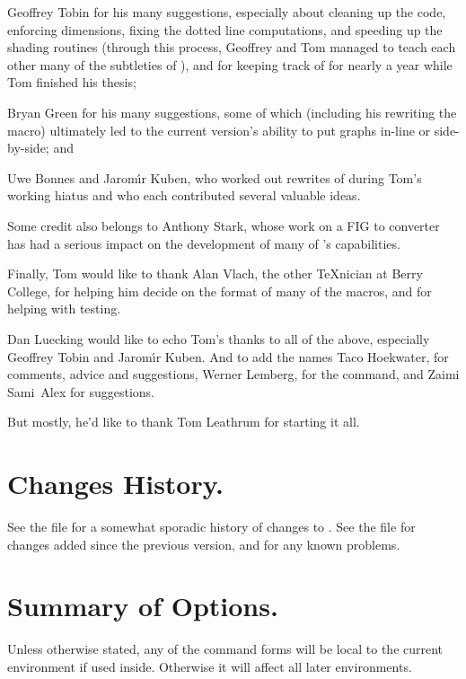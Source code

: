 \documentclass[letterpaper]{article}
\begin{document}
Geoffrey Tobin
for his many suggestions, especially about cleaning up the \MF{} code,
enforcing dimensions, fixing the dotted line computations, and speeding
up the shading routines (through this process, Geoffrey and Tom managed
to teach each other many of the subtleties of \MF{}), and for keeping
track of \mfp{} for nearly a year while Tom finished his thesis;

Bryan Green
for his many suggestions, some of which (including his rewriting the
 macro) ultimately led to the current version's ability to
put graphs in-line or side-by-side; and

Uwe Bonnes and
Jarom\'\i r Kuben,
who worked out rewrites of \mfp{} during Tom's working hiatus and who
each contributed several valuable ideas.

Some credit also belongs to
Anthony Stark,
whose work on a FIG to \MF{} converter has had a serious impact on the
development of many of \mfp{}'s capabilities.

Finally, Tom would like to thank
Alan Vlach,
the other \TeX{}nician at Berry College, for helping him decide on the
format of many of the macros, and for helping with testing.

\medskip
Dan Luecking would like to echo Tom's thanks to all of the above,
especially Geoffrey Tobin and Jarom\'\i r Kuben. And to add the names
Taco Hoekwater, for comments, advice and suggestions, Werner Lemberg,
for the  command, and Zaimi Sami~Alex for suggestions.

But mostly, he'd like to thank Tom Leathrum for starting it all.

\section{Changes History.}\label{changes}

See the file  for a somewhat sporadic history of
changes to \mfp{}. See the file  for changes added since
the previous version, and for any known problems.

\section{Summary of Options.}\label{summary}

Unless otherwise stated, any of the command forms will be local to the
current  environment if used inside. Otherwise it will affect
all later environments.
\end{document}
